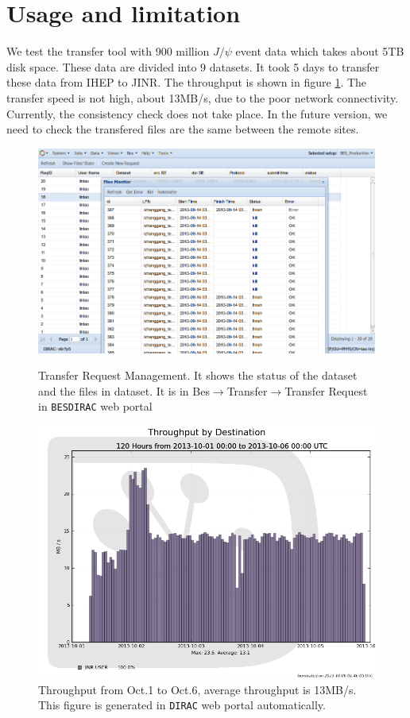 \section{Usage and limitation}
We test the transfer tool with 900 million $J/\psi$ event data 
which takes about 5TB disk space. 
These data are divided into 9 datasets.
It took 5 days to transfer 
these data from IHEP to JINR. The throughput is shown in 
figure \ref{fig:throughput}.
The transfer speed is not high, about 13MB/s,
due to the poor network connectivity.
Currently, the consistency check does not take place.
In the future version, we need to check the transfered files 
are the same between the remote sites.
\begin{figure}[h]
\begin{minipage}{.49\textwidth}
\includegraphics[width=.95\textwidth, keepaspectratio]{data/transreqlist-with-kill-retransfer.png}
\caption{\label{fig:ui}Transfer Request Management.
It shows the status of the dataset and the files in dataset.
It is in Bes$\to$Transfer$\to$Transfer Request in {\tt BESDIRAC}
web portal}
\end{minipage}
\hspace{.02\textwidth}
\begin{minipage}{.49\textwidth}
\includegraphics[width=.95\textwidth, keepaspectratio]{data/throughput-dest-1001-10-06.png}
\caption{\label{fig:throughput}Throughput from Oct.1 to Oct.6, 
average throughput is 13MB/s. This figure is generated in 
{\tt DIRAC} web portal automatically.}
\end{minipage}
\end{figure}

